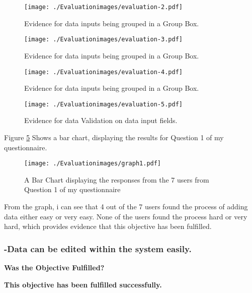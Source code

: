 \begin{figure}[H]
\caption{Evidence for data inputs being grouped in a Group Box.} \label{fig:evaluation-2}
\hfill\texttt{[image: ./Evaluationimages/evaluation-2.pdf]}
\end{figure}

\begin{figure}[H]
\caption{Evidence for data inputs being grouped in a Group Box.} \label{fig:evaluation-3}
\hfill\texttt{[image: ./Evaluationimages/evaluation-3.pdf]}
\end{figure}

\begin{figure}[H]
\caption{Evidence for data inputs being grouped in a Group Box.} \label{fig:evaluation-4}
\hfill\texttt{[image: ./Evaluationimages/evaluation-4.pdf]}
\end{figure}

\begin{figure}[H]
\caption{Evidence for data Validation on data input fields.} \label{fig:evaluation-5}
\hfill\texttt{[image: ./Evaluationimages/evaluation-5.pdf]}
\end{figure}

\pagebreak

Figure \ref{graph1} Shows a bar chart, displaying the results for Question 1 of my questionnaire.

\begin{figure}[H]
\caption{A Bar Chart displaying the responses from the 7 users from Question 1 of my questionnaire} \label{graph1}
\hfill\texttt{[image: ./Evaluationimages/graph1.pdf]}
\end{figure}

From the graph, i can see that 4 out of the 7 users found the process of adding data either easy or very easy. None of the users found the process hard or very hard, which provides evidence that this objective has been fulfilled.





\pagebreak
\subsubsection{-Data can be edited within the system easily.}
\textbf{Was the Objective Fulfilled?} \newline

\textbf{\large{This objective has been fulfilled successfully.}}

